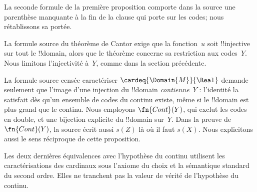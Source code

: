\documentclass[../../../include/open-logic-section]{subfiles}
\begin{document}
\begin{editorial}
La seconde formule de la première proposition
comporte dans la source une parenthèse
manquante à la fin de la clause qui porte
sur les codes; nous rétablissons sa portée.

La formule source du théorème de Cantor exige
que la fonction~$u$ soit !!{injective} sur
tout le !!{domain}, alors que le théorème
concerne sa restriction aux codes~$Y$. Nous
limitons l'injectivité à~$Y$, comme dans la
section précédente.

La formule source censée caractériser
$\cardeq{\Domain{M}}{\Real}$ demande
seulement que l'image d'une injection du
!!{domain} \emph{contienne}~$Y$ : l'identité
la satisfait dès qu'un ensemble de codes
du continu existe, même si le !!{domain}
est plus grand que le continu. Nous employons
$\fn{Cont}(Y)$, qui exclut les codes en double,
et une bijection explicite du !!{domain}
sur~$Y$. Dans la preuve de $\fn{Cont}(Y)$,
la source écrit aussi $s(Z)$ là où il faut
$s(X)$. Nous explicitons aussi le sens réciproque de cette proposition.

Les deux dernières équivalences avec
l'hypothèse du continu utilisent les
caractérisations des cardinaux sous l'axiome
du choix et la sémantique standard du second
ordre. Elles ne tranchent pas la valeur de
vérité de l'hypothèse du continu.
\end{editorial}
\end{document}
